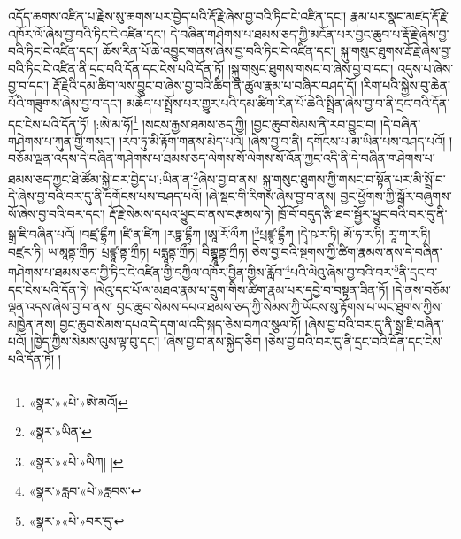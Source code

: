 འདོད་ཆགས་འཛིན་པ་རྗེས་སུ་ཆགས་པར་བྱེད་པའི་རྡོ་རྗེ་ཞེས་བྱ་བའི་ཏིང་ངེ་འཛིན་དང་། རྣམ་པར་སྣང་མཛད་རྡོ་རྗེ་འཁོར་ལོ་ཞེས་བྱ་བའི་ཏིང་ངེ་འཛིན་དང་། དེ་བཞིན་གཤེགས་པ་ཐམས་ཅད་ཀྱི་མངོན་པར་བྱང་ཆུབ་པ་རྡོ་རྗེ་ཞེས་བྱ་བའི་ཏིང་ངེ་འཛིན་དང་། ཆོས་རིན་པོ་ཆེ་འབྱུང་གནས་ཞེས་བྱ་བའི་ཏིང་ངེ་འཛིན་དང་། སྐུ་གསུང་ཐུགས་རྡོ་རྗེ་ཞེས་བྱ་བའི་ཏིང་ངེ་འཛིན་ནི་དྲང་བའི་དོན་དང་ངེས་པའི་དོན་ཏོ། །སྐུ་གསུང་ཐུགས་གསང་བ་ཞེས་བྱ་བ་དང་། འདུས་པ་ཞེས་བྱ་བ་དང་། རྡོ་རྗེའི་དམ་ཚིག་ལས་བྱུང་བ་ཞེས་བྱ་བའི་ཚིག་ནི་ཚུལ་རྣམ་པ་བཞིར་བཤད་དོ། །རིག་པའི་སྐྱེས་བུ་ཆེན་པོའི་གཟུགས་ཞེས་བྱ་བ་དང་། མཆོད་པ་སྤྲོས་པར་གྱུར་པའི་དམ་ཚིག་རིན་པོ་ཆེའི་སྤྲིན་ཞེས་བྱ་བ་ནི་དྲང་བའི་དོན་དང་ངེས་པའི་དོན་ཏོ། །:ཨེ་མ་ཧོ།\footnote{«སྣར་»«པེ་»ཨེ་མའོ།} །སངས་རྒྱས་ཐམས་ཅད་ཀྱི། །བྱང་ཆུབ་སེམས་ནི་རབ་བྱུང་བ། །དེ་བཞིན་གཤེགས་པ་ཀུན་གྱི་གསང་། །རབ་ཏུ་མི་རྟོག་གནས་མེད་པའོ། །ཞེས་བྱ་བ་ནི། དགོངས་པ་མ་ཡིན་པས་བཤད་པའོ། །བཅོམ་ལྡན་འདས་དེ་བཞིན་གཤེགས་པ་ཐམས་ཅད་ལེགས་སོ་ལེགས་སོ་འོན་ཀྱང་འདི་ནི་དེ་བཞིན་གཤེགས་པ་ཐམས་ཅད་ཀྱང་ཐེ་ཚོམ་སྐྱེ་བར་བྱེད་པ་:ཡིན་ན་\footnote{«སྣར་»ཡིན་}ཞེས་བྱ་བ་ནས། སྐུ་གསུང་ཐུགས་ཀྱི་གསང་བ་སྟོན་པར་མི་སྤྲོ་བ་དེ་ཞེས་བྱ་བའི་བར་དུ་ནི་དགོངས་པས་བཤད་པའོ། །ཞེ་སྡང་གི་རིགས་ཞེས་བྱ་བ་ནས། བྱང་ཕྱོགས་ཀྱི་སྒོར་བཞུགས་སོ་ཞེས་བྱ་བའི་བར་དང་། རྡོ་རྗེ་སེམས་དཔའ་ཕྱུང་བ་ནས་བརྩམས་ཏེ། ཁྲོ་བོ་བདུད་རྩི་ཐབ་སྦྱོར་ཕྱུང་བའི་བར་དུ་ནི་སྒྲ་ཇི་བཞིན་པའོ། །བཛྲ་དྷྲྀཀ །ཛི་ན་ཛིཀ །རཏྣ་དྷྲྀཀ །ཨཱ་རོ་ལྀཀ །\footnote{«སྣར་»«པེ་»ལིཀ། །}པྲཛྙཱ་དྷྲྀཀ །དྭེ་ཥ་ར་ཏི། མོ་ཧ་ར་ཏི། རཱ་ག་ར་ཏི། བཛྲར་ཏི། ཡ་མཱནྟ་ཀྲྀཏ། པྲཛྙཱ་ནྟ་ཀྲྀཏ། པདྨཱནྟ་ཀྲྀཏ། བིགྷྣཱནྟ་ཀྲྀཏ། ཅེས་བྱ་བའི་སྔགས་ཀྱི་ཚིག་རྣམས་ནས་དེ་བཞིན་གཤེགས་པ་ཐམས་ཅད་ཀྱི་ཏིང་ངེ་འཛིན་གྱི་དཀྱིལ་འཁོར་བྱིན་གྱིས་རློབ་\footnote{«སྣར་»རླབ་«པེ་»རླབས་}པའི་ལེའུ་ཞེས་བྱ་བའི་བར་\footnote{«སྣར་»«པེ་»བར་དུ་}ནི་དྲང་བ་དང་ངེས་པའི་དོན་ཏེ། །ལེའུ་དང་པོ་ལ་མཐའ་རྣམ་པ་དྲུག་གིས་ཚིག་རྣམ་པར་དབྱེ་བ་བསྟན་ཟིན་ཏོ། །དེ་ནས་བཅོམ་ལྡན་འདས་ཞེས་བྱ་བ་ནས། བྱང་ཆུབ་སེམས་དཔའ་ཐམས་ཅད་ཀྱི་སེམས་ཀྱི་ཡོངས་སུ་རྟོགས་པ་ཡང་ཐུགས་ཀྱིས་མཁྱེན་ནས། བྱང་ཆུབ་སེམས་དཔའ་དེ་དག་ལ་འདི་སྐད་ཅེས་བཀའ་སྩལ་ཏོ། །ཞེས་བྱ་བའི་བར་དུ་ནི་སྒྲ་ཇི་བཞིན་པའོ། །ཁྱེད་ཀྱིས་སེམས་ལུས་ལྟ་བུ་དང་། །ཞེས་བྱ་བ་ནས་སྐྱེད་ཅིག །ཅེས་བྱ་བའི་བར་དུ་ནི་དྲང་བའི་དོན་དང་ངེས་པའི་དོན་ཏོ། །

